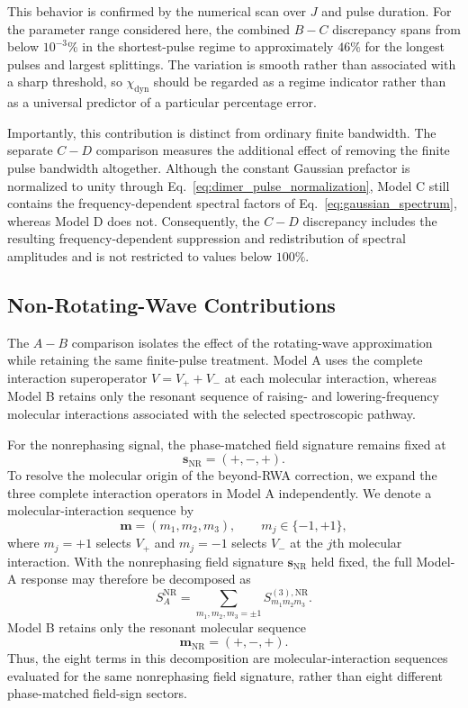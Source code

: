 This behavior is confirmed by the numerical scan over $J$ and pulse
duration.
For the parameter range considered here, the combined $B-C$
discrepancy spans from below $10^{-3}\%$ in the shortest-pulse regime
to approximately $46\%$ for the longest pulses and largest splittings.
The variation is smooth rather than associated with a sharp threshold,
so $\chi_{\mathrm{dyn}}$ should be regarded as a regime indicator rather
than as a universal predictor of a particular percentage error.

Importantly, this contribution is distinct from ordinary finite
bandwidth.
The separate $C-D$ comparison measures the additional effect of
removing the finite pulse bandwidth altogether. Although the constant
Gaussian prefactor is normalized to unity through
Eq.~\eqref{eq:dimer_pulse_normalization}, Model C still contains the
frequency-dependent spectral factors of
Eq.~\eqref{eq:gaussian_spectrum}, whereas Model D does not.
Consequently, the $C-D$ discrepancy includes the resulting
frequency-dependent suppression and redistribution of spectral
amplitudes and is not restricted to values below $100\%$.

\subsection{Non-Rotating-Wave Contributions}
\label{subsec:nonrwa}

The $A-B$ comparison isolates the effect of the rotating-wave
approximation while retaining the same finite-pulse treatment.
Model A uses the complete interaction superoperator
$V=V_{+}+V_{-}$ at each molecular interaction, whereas Model B
retains only the resonant sequence of raising- and lowering-frequency
molecular interactions associated with the selected spectroscopic
pathway.

For the nonrephasing signal, the phase-matched field signature remains
fixed at
%
\begin{equation}
\mathbf{s}_{\mathrm{NR}}=(+,-,+).
\end{equation}
%
To resolve the molecular origin of the beyond-RWA correction, we
expand the three complete interaction operators in Model A
independently. We denote a molecular-interaction sequence by
%
\begin{equation}
\mathbf{m}=(m_1,m_2,m_3),
\qquad
m_j\in\{-1,+1\},
\end{equation}
%
where $m_j=+1$ selects $V_{+}$ and $m_j=-1$ selects $V_{-}$ at the
$j$th molecular interaction. With the nonrephasing field signature
$\mathbf{s}_{\mathrm{NR}}$ held fixed, the full Model-A response may
therefore be decomposed as
%
\begin{equation}
S^{\mathrm{NR}}_{A}
=
\sum_{m_1,m_2,m_3=\pm1}
S^{(3),\mathrm{NR}}_{m_1m_2m_3}.
\end{equation}
%
Model B retains only the resonant molecular sequence
%
\begin{equation}
\mathbf{m}_{\mathrm{NR}}=(+,-,+).
\end{equation}
%
Thus, the eight terms in this decomposition are molecular-interaction
sequences evaluated for the same nonrephasing field signature, rather
than eight different phase-matched field-sign sectors.

